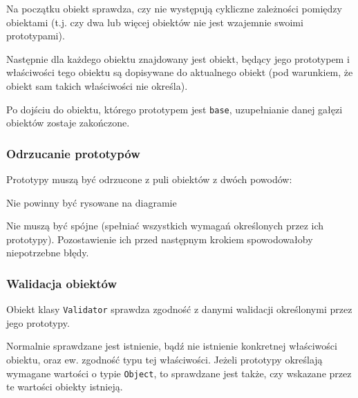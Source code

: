 Na początku obiekt sprawdza, czy nie występują cykliczne zależności pomiędzy obiektami (t.j. czy dwa lub więcej obiektów nie jest wzajemnie swoimi prototypami).

Następnie dla każdego obiektu znajdowany jest obiekt, będący jego prototypem i właściwości tego obiektu są dopisywane do aktualnego obiekt (pod warunkiem, że obiekt sam takich właściwości nie określa).

Po dojściu do obiektu, którego prototypem jest \texttt{base}, uzupełnianie danej gałęzi obiektów zostaje zakończone.

\subsubsection{Odrzucanie prototypów}
Prototypy muszą być odrzucone z puli obiektów z dwóch powodów:
\begin{itemize*}
  \item{Nie powinny być rysowane na diagramie}
  \item{Nie muszą być spójne} (spełniać wszystkich wymagań określonych przez ich prototypy). Pozostawienie ich przed następnym krokiem spowodowałoby niepotrzebne błędy.
\end{itemize*}

\subsubsection{Walidacja obiektów}
Obiekt klasy \texttt{Validator} sprawdza zgodność z danymi walidacji określonymi przez jego prototypy.

Normalnie sprawdzane jest istnienie, bądź nie istnienie konkretnej właściwości obiektu, oraz ew. zgodność typu tej właściwości.
Jeżeli prototypy określają wymagane wartości o typie \texttt{Object}, to sprawdzane jest także, czy wskazane przez te wartości obiekty istnieją.
